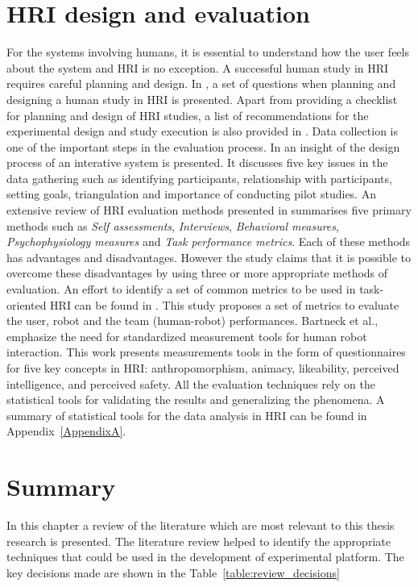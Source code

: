\section{HRI design and evaluation} %
For the systems involving humans, it is essential to understand how the user feels about the system and HRI is no exception. A successful human study in HRI requires careful planning and design. In \cite{bethel2010review}, a set of questions when planning and designing a human study in HRI is presented. Apart from providing a checklist for planning and design of HRI studies, a list of recommendations for the experimental design and study execution is also provided in \cite{bethel2010review}.	Data collection is one of the important steps in the evaluation process. In \cite{Rogers2011} an insight of the design process of an interative system is presented. It discusses five key issues in the data gathering such as identifying participants, relationship with participants, setting goals, triangulation and importance of conducting pilot studies. An extensive review of HRI evaluation methods presented in \cite{bethel2010review} summarises five primary methods such as \emph{Self assessments}, \emph{Interviews}, \emph{Behavioral measures}, \emph{Psychophysiology measures} and \emph{Task performance metrics}. Each of these methods has advantages and disadvantages. However the study claims that it is possible to overcome these disadvantages by using three or more appropriate methods of evaluation. An effort to identify a set of common metrics to be used in task-oriented HRI can be found in \cite{Steinfeld2006}. This study proposes a set of metrics to evaluate the user, robot and the team (human-robot) performances. Bartneck et al., \cite{bartneck2009measurement} emphasize the need for standardized measurement tools for human robot interaction. This work presents measurements tools in the form of questionnaires for five key concepts in HRI: anthropomorphism, animacy, likeability, perceived intelligence, and perceived safety. All the evaluation techniques rely on the statistical tools for validating the results and generalizing the phenomena. A summary of statistical tools for the data analysis in HRI can be found in Appendix~\ref{AppendixA}.

\section{Summary}
In this chapter a review of the literature which are most relevant to this thesis research is presented. The literature review helped to identify the appropriate techniques that could be used in the development of experimental platform. The key decisions made are shown in the Table~\ref{table:review_decisions}

